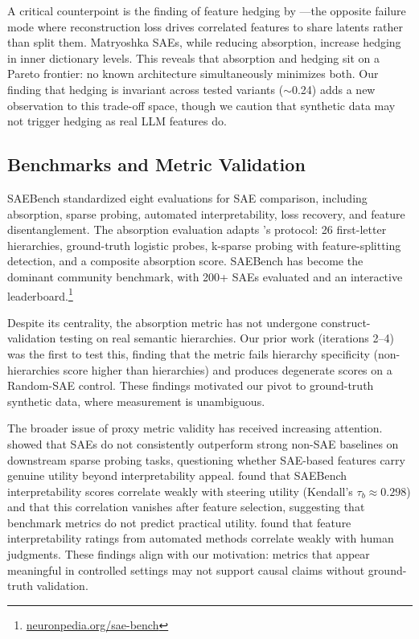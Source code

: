 \documentclass{article}
\begin{document}
A critical counterpoint is the finding of feature hedging by \citet{chanin2025hedging}---the opposite failure mode where reconstruction loss drives correlated features to share latents rather than split them. Matryoshka SAEs, while reducing absorption, increase hedging in inner dictionary levels. This reveals that absorption and hedging sit on a Pareto frontier: no known architecture simultaneously minimizes both. Our finding that hedging is invariant across tested variants ($\sim$0.24) adds a new observation to this trade-off space, though we caution that synthetic data may not trigger hedging as real LLM features do.

\subsection{Benchmarks and Metric Validation}

SAEBench \citep{karvonen2025saebench} standardized eight evaluations for SAE comparison, including absorption, sparse probing, automated interpretability, loss recovery, and feature disentanglement. The absorption evaluation adapts \citeauthor{chanin2024feature}'s protocol: 26 first-letter hierarchies, ground-truth logistic probes, k-sparse probing with feature-splitting detection, and a composite absorption score. SAEBench has become the dominant community benchmark, with 200+ SAEs evaluated and an interactive leaderboard.\footnote{\url{neuronpedia.org/sae-bench}}

Despite its centrality, the absorption metric has not undergone construct-validation testing on real semantic hierarchies. Our prior work (iterations 2--4) was the first to test this, finding that the metric fails hierarchy specificity (non-hierarchies score higher than hierarchies) and produces degenerate scores on a Random-SAE control. These findings motivated our pivot to ground-truth synthetic data, where measurement is unambiguous.

The broader issue of proxy metric validity has received increasing attention. \citet{kantamneni2025saebaseline} showed that SAEs do not consistently outperform strong non-SAE baselines on downstream sparse probing tasks, questioning whether SAE-based features carry genuine utility beyond interpretability appeal. \citet{wang2025saeinterp} found that SAEBench interpretability scores correlate weakly with steering utility (Kendall's $\tau_b \approx 0.298$) and that this correlation vanishes after feature selection, suggesting that benchmark metrics do not predict practical utility. \citet{lieberum2024automated} found that feature interpretability ratings from automated methods correlate weakly with human judgments. These findings align with our motivation: metrics that appear meaningful in controlled settings may not support causal claims without ground-truth validation.
\end{document}
